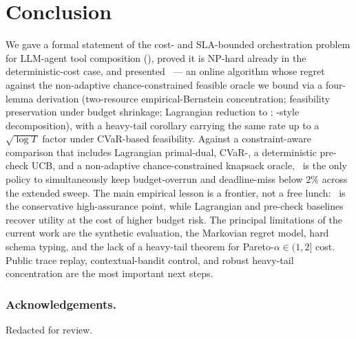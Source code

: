 \section{Conclusion}
\label{sec:conclusion}

We gave a formal statement of the cost- and SLA-bounded orchestration
problem for LLM-agent tool composition (\CBSLAO), proved it is
NP-hard already in the deterministic-cost case, and presented
\CBUC~--- an online algorithm whose regret against the non-adaptive
chance-constrained feasible oracle we bound via a four-lemma
derivation (two-resource empirical-Bernstein concentration;
feasibility preservation under budget shrinkage; Lagrangian reduction
to \BwK; \BwK-style decomposition), with a heavy-tail corollary
carrying the same rate up to a $\sqrt{\log T}$ factor under
CVaR-based feasibility. Against a constraint-aware comparison that
includes Lagrangian primal-dual, CVaR-\BwK, a deterministic pre-check
UCB, and a non-adaptive chance-constrained knapsack oracle, \CBUC~is
the only policy to simultaneously keep budget-overrun and
deadline-miss below $2\%$ across the extended sweep. The main
empirical lesson is a frontier, not a free lunch: \CBUC~is the
conservative high-assurance point, while Lagrangian and pre-check
baselines recover utility at the cost of higher budget risk. The
principal limitations of the current work are the synthetic
evaluation, the Markovian regret model, hard schema typing, and the
lack of a heavy-tail theorem for Pareto-$\alpha \in (1,2]$ cost.
Public trace replay, contextual-bandit control, and robust heavy-tail
concentration are the most important next steps.

\subsubsection*{Acknowledgements.}
Redacted for review.
